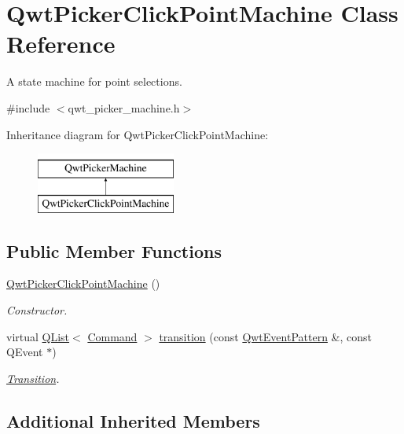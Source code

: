 \hypertarget{class_qwt_picker_click_point_machine}{\section{Qwt\-Picker\-Click\-Point\-Machine Class Reference}
\label{class_qwt_picker_click_point_machine}
}


A state machine for point selections.  




{\ttfamily \#include $<$qwt\-\_\-picker\-\_\-machine.\-h$>$}

Inheritance diagram for Qwt\-Picker\-Click\-Point\-Machine\-:\begin{figure}[H]
\begin{center}
\leavevmode
\includegraphics[height=2.000000cm]{class_qwt_picker_click_point_machine}
\end{center}
\end{figure}
\subsection*{Public Member Functions}
\begin{DoxyCompactItemize}
\item 
\hyperlink{class_qwt_picker_click_point_machine_aa4bab7db982c16270176957451db1d8e}{Qwt\-Picker\-Click\-Point\-Machine} ()
\begin{DoxyCompactList}\small\item\em Constructor. \end{DoxyCompactList}\item 
virtual \hyperlink{class_q_list}{Q\-List}$<$ \hyperlink{class_qwt_picker_machine_a3a8d3d4c107ce5f8351e4cbdd38c43f7}{Command} $>$ \hyperlink{class_qwt_picker_click_point_machine_a07b6da1b620dcdb304176c3f40d603df}{transition} (const \hyperlink{class_qwt_event_pattern}{Qwt\-Event\-Pattern} \&, const Q\-Event $\ast$)
\begin{DoxyCompactList}\small\item\em \hyperlink{class_transition}{Transition}. \end{DoxyCompactList}\end{DoxyCompactItemize}
\subsection*{Additional Inherited Members}


